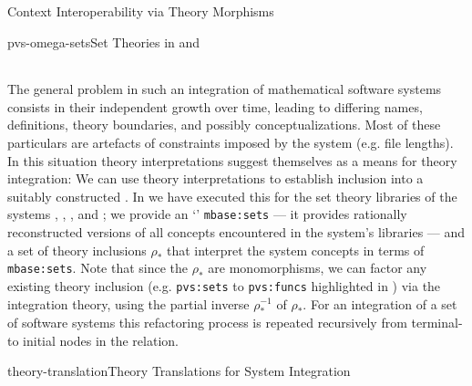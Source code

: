\begin{tsubsection}[id=integrating-libraries]{Context Interoperability via Theory
    Morphisms}
\begin{myfig}{pvs-omega-sets}{Set Theories in {\OMEGA} and {\pvs}}
\begin{tabular}{|>{\tt}l|>{\tt}l|||>{\tt}l|>{\tt}l|}
  \end{tabular}
\end{myfig}
The general problem in such an integration of mathematical software systems consists in
their independent growth over time, leading to differing names, definitions, theory
boundaries, and possibly conceptualizations. Most of these particulars are artefacts of
constraints imposed by the system (e.g. file lengths). In this situation theory
interpretations suggest themselves as a means for theory integration: We can use theory
interpretations to establish inclusion into a suitably constructed
{}. In {} we have executed this
for the set theory libraries of the systems {\pvs}, {\OMEGA}, {\tps}, and {\imps}; we
provide an `{}' {\tt{mbase:sets}} --- it provides rationally
reconstructed versions of all concepts encountered in the system's libraries --- and a set
of theory inclusions $\rho_*$ that interpret the system concepts in terms of
{\tt{mbase:sets}}. Note that since the $\rho_*$ are monomorphisms, we can factor any
existing theory inclusion (e.g. {\tt{pvs:sets}} to {\tt{pvs:funcs}} highlighted in
{}) via the integration theory, using the partial inverse
$\rho_*^{-1}$ of $\rho_*$. For an integration of a set of software systems this
refactoring process is repeated recursively from terminal- to initial nodes in the
{} relation.

\begin{myfig}{theory-translation}{Theory Translations for System Integration}\small
\end{myfig}


\end{tsubsection}
